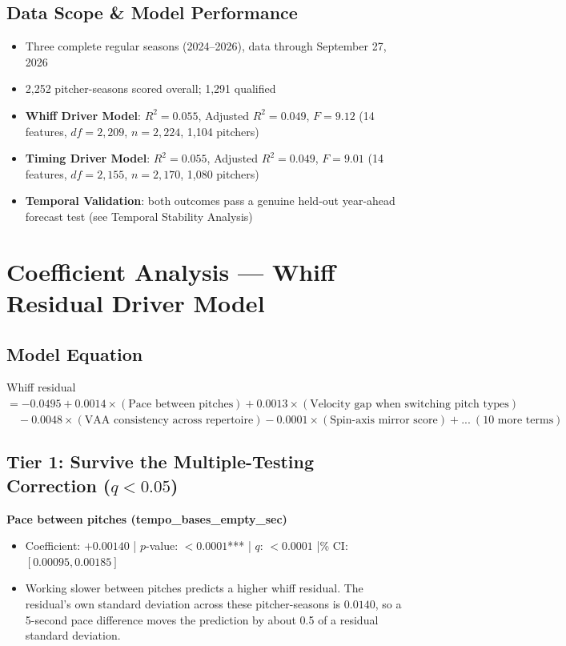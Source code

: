 \documentclass[11pt]{article}
\newcommand{\feat}[1]{\textbf{#1}}
\begin{document}
\subsection*{Data Scope \& Model Performance}
\begin{itemize}
\item Three complete regular seasons (2024--2026), data through September 27, 2026
\item 2,252 pitcher-seasons scored overall; 1,291 qualified
\item \textbf{Whiff Driver Model}: $R^2=0.055$, Adjusted $R^2=0.049$, $F=9.12$ (14 features, $df=2,209$, $n=2,224$, 1,104 pitchers)
\item \textbf{Timing Driver Model}: $R^2=0.055$, Adjusted $R^2=0.049$, $F=9.01$ (14 features, $df=2,155$, $n=2,170$, 1,080 pitchers)
\item \textbf{Temporal Validation}: both outcomes pass a genuine held-out year-ahead forecast test (see Temporal Stability Analysis)
\end{itemize}


\section*{Coefficient Analysis --- Whiff Residual Driver Model}

\subsection*{Model Equation}
Whiff residual $= -0.0495 +0.0014\times(\text{Pace between pitches}) +0.0013\times(\text{Velocity gap when switching pitch types})$
$\quad -0.0048\times(\text{VAA consistency across repertoire}) -0.0001\times(\text{Spin-axis mirror score}) + ...\ (10\text{ more terms})$

\subsection*{Tier 1: Survive the Multiple-Testing Correction ($q<0.05$)}

\feat{Pace between pitches (tempo\_bases\_empty\_sec)}
\begin{itemize}
\item Coefficient: $+0.00140$ \;|\; $p$-value: $<0.0001$*** \;|\; $q$: $<0.0001$ \;|\% CI: $[0.00095, 0.00185]$
\item Working slower between pitches predicts a higher whiff residual. The residual's own standard deviation across these pitcher-seasons is $0.0140$, so a 5-second pace difference moves the prediction by about 0.5 of a residual standard deviation.
\end{itemize}
\end{document}
